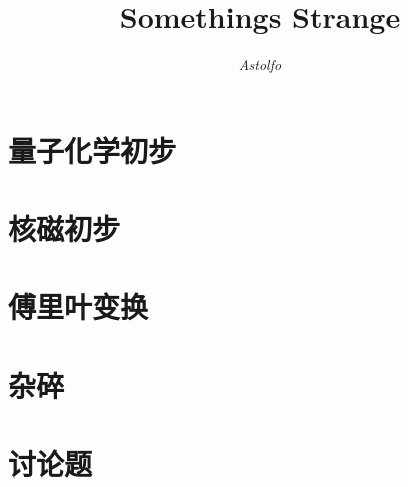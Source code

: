 \documentclass[lang=cn,10pt]{elegantbook}
\title{Somethings Strange}
\author{\textit{Astolfo}}
\begin{document}
\maketitle
\frontmatter


\mainmatter
\tableofcontents
\chapter{量子化学初步}

\chapter{核磁初步}

\chapter{傅里叶变换}

\chapter{杂碎}

\chapter{讨论题}

\end{document}
